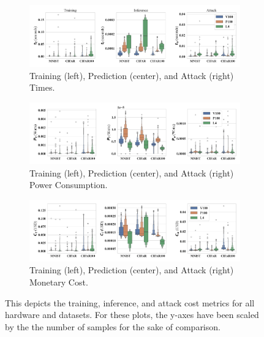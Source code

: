 \documentclass[conference]{IEEEtran}
\begin{document}
{\begin{figure}[h]
    \centering
    \begin{subfigure}[b]{.8\textwidth}
        \includegraphics[width=\linewidth,clip]{plots/combined/time.pdf}
        \caption{Training (left), Prediction (center), and Attack (right) Times.}
        \label{fig:time}
    \end{subfigure}
    \begin{subfigure}[b]{.8\textwidth}
        \includegraphics[width=\linewidth,clip]{plots/combined/power.pdf}
        \caption{Training (left), Prediction (center), and Attack (right) Power Consumption.}
        \label{fig:power}
    \end{subfigure}
    \begin{subfigure}[b]{.8\textwidth}
        \includegraphics[width=\linewidth,clip]{plots/combined/cost.pdf}
        \caption{Training (left), Prediction (center), and Attack (right) Monetary Cost.}
        \label{fig:cost}
    \end{subfigure}
    \caption{This depicts the training, inference, and attack cost metrics for all hardware and datasets. For these plots, the y-axes have been scaled by the the number of samples for the sake of comparison.}
\end{figure}


}
\end{document}
